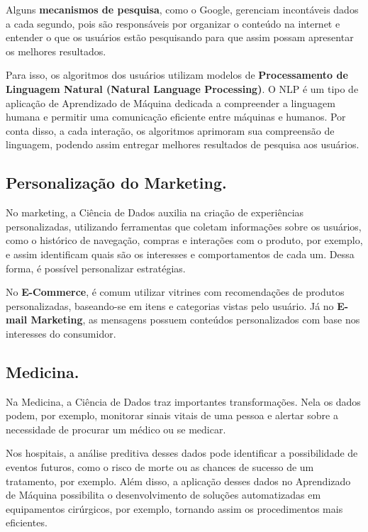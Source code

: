 \documentclass[12pt]{article}
\begin{document}
Alguns \textbf{mecanismos de pesquisa}, como o Google, gerenciam incontáveis dados a cada segundo, pois são responsáveis por organizar o conteúdo na internet e entender o que os usuários estão pesquisando para que assim possam apresentar os melhores resultados.

Para isso, os algoritmos dos usuários utilizam modelos de \textbf{Processamento de Linguagem Natural (Natural Language Processing)}. O NLP é um tipo de aplicação de Aprendizado de Máquina dedicada a compreender a linguagem humana e permitir uma comunicação eficiente entre máquinas e humanos. Por conta disso, a cada interação, os algoritmos aprimoram sua compreensão de linguagem, podendo assim entregar melhores resultados de pesquisa aos usuários.

\subsection{Personalização do Marketing.}

No marketing, a Ciência de Dados auxilia na criação de experiências personalizadas, utilizando ferramentas que coletam informações sobre os usuários, como o histórico de navegação, compras e interações com o produto, por exemplo, e assim identificam quais são os interesses e comportamentos de cada um. Dessa forma, é possível personalizar estratégias.

No \textbf{E-Commerce}, é comum utilizar vitrines com recomendações de produtos personalizadas, baseando-se em itens e categorias vistas pelo usuário. Já no \textbf{E-mail Marketing}, as mensagens possuem conteúdos personalizados com base nos interesses do consumidor.

\subsection{Medicina.}

Na Medicina, a Ciência de Dados traz importantes transformações. Nela os dados podem, por exemplo, monitorar sinais vitais de uma pessoa e alertar sobre a necessidade de procurar um médico ou se medicar.

Nos hospitais, a análise preditiva desses dados pode identificar a possibilidade de eventos futuros, como o risco de morte ou as chances de sucesso de um tratamento, por exemplo. Além disso, a aplicação desses dados no Aprendizado de Máquina possibilita o desenvolvimento de soluções automatizadas em equipamentos cirúrgicos, por exemplo, tornando assim os procedimentos mais eficientes.
\end{document}
